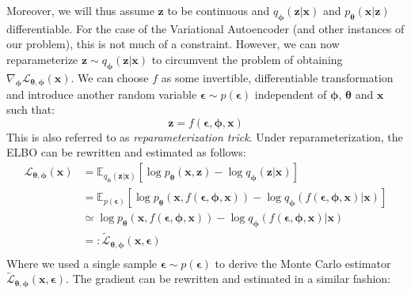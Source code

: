 \documentclass[12pt]{report}
\theoremstyle{definition}
\begin{document}
Moreover, we will thus assume $\mathbf{z}$ to be continuous and $q_{\pmb{\phi}}(\mathbf{z}|\mathbf{x})$ and $p_{\pmb{\theta}}(\mathbf{x}|\mathbf{z})$ differentiable. For the case of the Variational Autoencoder (and other instances of our problem), this is not much of a constraint. However, we can now reparameterize $\mathbf{z} \sim q_{\pmb{\phi}}(\mathbf{z}|\mathbf{x})$ to circumvent the problem of obtaining $\nabla_{\pmb{\phi}}\mathcal{L}_{\pmb{\theta}, \pmb{\phi}}(\mathbf{x})$. We can choose $f$ as some invertible, differentiable transformation and introduce another random variable $\pmb{\epsilon} \sim p(\pmb{\epsilon})$ independent of $\pmb{\phi}$, $\pmb{\theta}$ and $\mathbf{x}$ such that:
\begin{equation}
\mathbf{z} = f(\pmb{\epsilon}, \pmb{\phi}, \mathbf{x})
\end{equation}
This is also referred to as \emph{reparameterization trick}. Under reparameterization, the ELBO can be rewritten and estimated as follows:
\begin{equation}
\begin{split}
\mathcal{L}_{\pmb{\theta}, \pmb{\phi}}(\mathbf{x})
& = \mathbb{E}_{q_{\pmb{\phi}}(\mathbf{z}|\mathbf{x})}\left[ \log p_{\pmb{\theta}}(\mathbf{x}, \mathbf{z}) - \log q_{\pmb{\phi}}(\mathbf{z}|\mathbf{x})\right]\\
& = \mathbb{E}_{p(\pmb{\epsilon})}\left[ \log p_{\pmb{\theta}}(\mathbf{x}, f(\pmb{\epsilon}, \pmb{\phi}, \mathbf{x})) - \log q_{\pmb{\phi}}(f(\pmb{\epsilon}, \pmb{\phi}, \mathbf{x})|\mathbf{x}) \right]	\\
& \simeq \log p_{\pmb{\theta}}(\mathbf{x}, f(\pmb{\epsilon}, \pmb{\phi}, \mathbf{x})) - \log q_{\pmb{\phi}}(f(\pmb{\epsilon}, \pmb{\phi}, \mathbf{x})|\mathbf{x})\\
& =: \tilde{\mathcal{L}}_{\pmb{\theta}, \pmb{\phi}}(\mathbf{x}, \pmb{\epsilon})\\
\end{split}
\end{equation}
Where we used a single sample $\pmb{\epsilon}\sim p(\pmb{\epsilon})$ to derive the Monte Carlo estimator $\tilde{\mathcal{L}}_{\pmb{\theta}, \pmb{\phi}}(\mathbf{x}, \pmb{\epsilon})$. The gradient can be rewritten and estimated in a similar fashion:
\end{document}
